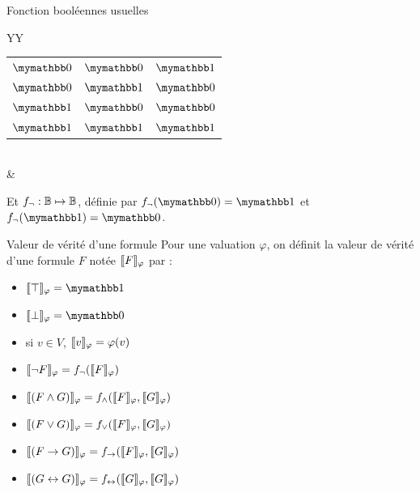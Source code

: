\documentclass[10pt]{beamer}
\begin{document}
\begin{frame}{\Ctitle}{\stitle}
\begin{block}{Fonction booléennes usuelles}
\begin{tabularx}{\textwidth}{YY}
\begin{tabular}{l|l|l}
				\hline
				 $\faux$ &  $\faux$ &  $\vrai$            \\
				 $\faux$ &  $\vrai$ &  $\faux$            \\
				 $\vrai$ &  $\faux$ &  $\faux$            \\
				 $\vrai$ &  $\vrai$ &  $\vrai$            \\
			\end{tabular}      \\
			                                                    & \\
		\end{tabularx}
		Et $f_{\neg} : \mathbb{B} \mapsto \mathbb{B}$, définie par $f_\non(\faux) = \vrai$ et $f_\non(\vrai) = \faux$.
	\end{block}
\end{frame}

\begin{frame}{\Ctitle}{\stitle}
	\begin{alertblock}{Valeur de vérité d'une formule}
		Pour une valuation $\varphi$, on définit la valeur de vérité d'une formule $F$ notée $\llbracket F \rrbracket_{\varphi}$ par :
		\begin{itemize}
			\item<2-> $\vv{\top} = \vrai$
			\item<2-> $\vv{\bot} = \faux$
			\item<3-> si $v \in V$, $\llbracket v \rrbracket_{\varphi} = \varphi(v)$
			\item<4-> $\llbracket \neg F \rrbracket_{\varphi} = f_{\neg}(\llbracket F \rrbracket_{\varphi})$
			\item<5-> $\llbracket (F \wedge G) \rrbracket_{\varphi} = f_{\wedge}(\llbracket F \rrbracket_{\varphi},\llbracket G \rrbracket_{\varphi})$
			\item<5-> $\llbracket (F \vee G) \rrbracket_{\varphi} = f_{\vee}(\llbracket F \rrbracket_{\varphi},\llbracket G \rrbracket_{\varphi})$
			\item<5-> $\llbracket (F \to G) \rrbracket_{\varphi} = f_{\to}(\llbracket F \rrbracket_{\varphi},\llbracket G \rrbracket_{\varphi})$
			\item<5-> $\llbracket (G \leftrightarrow G) \rrbracket_{\varphi} = f_{\leftrightarrow}(\llbracket G \rrbracket_{\varphi},\llbracket G \rrbracket_{\varphi})$
		\end{itemize}
	\end{alertblock}
\end{frame}
\end{document}
